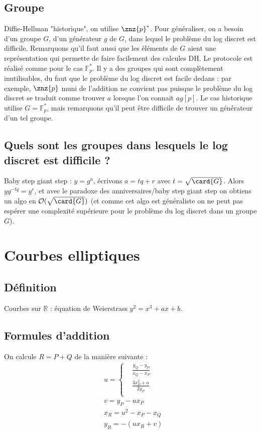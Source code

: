         \subsection{Groupe}
            Diffie-Hellman "historique", on utilise $\znz{p}^*$. Pour généraliser, on a besoin d'un groupe $G$, d'un générateur $g$ de $G$, dans lequel le problème du log discret est difficile. Remarquons qu'il faut aussi que les éléments de $G$ aient une représentation qui permette de faire facilement des calcules DH. Le protocole est réalisé comme pour le cas $\mathbb{F}_p^*$. Il y a des groupes qui sont complètement inutilisables, du faut que le problème du log discret est facile dedans : par exemple, $\znz{p}$ muni de l'addition ne convient pas puisque le problème du log discret se traduit comme trouver $a$ lorsque l'on connait $ag [p]$. Le cas historique utilise $G = \mathbb{F}_p^*$, mais remarquons qu'il peut être difficile de trouver un générateur d'un tel groupe.
            
        \subsection{Quels sont les groupes dans lesquels le log discret est difficile ?}
            \begin{remq}
                Baby step giant step : $y = g^a$, écrivons $a = tq + r$ avec $t = \sqrt{\card{G}}
                $. Alors $yg^{-tq} = g^r$, et avec le paradoxe des anniversaires/baby step giant step on obtiens un algo en $\mathcal{O}(\sqrt{\card{G}})$ (et comme cet algo est généraliste on ne peut pas espérer une complexité supérieure pour le problème du log discret dans un groupe $G$).
            \end{remq}

    \section{Courbes elliptiques}
        \subsection{Définition}
            Courbes sur $\mathbb{R}$ : équation de Weierstrass $y^2 = x^3 + ax + b$. 

        \subsection{Formules d'addition}
            On calcule $R = P + Q$ de la manière suivante :
            \begin{align*}
                &u =
                \begin{cases}
                    &\frac{y_Q - y_P}{x_Q - x_P} \\
                    &\frac{3x_P^2 + a}{2y_P} \\
                \end{cases} \\
                &v = y_P - ux_P \\
                &x_R = u^2 - x_P - x_Q \\
                &y_R = -(ux_R + v)
            \end{align*}

